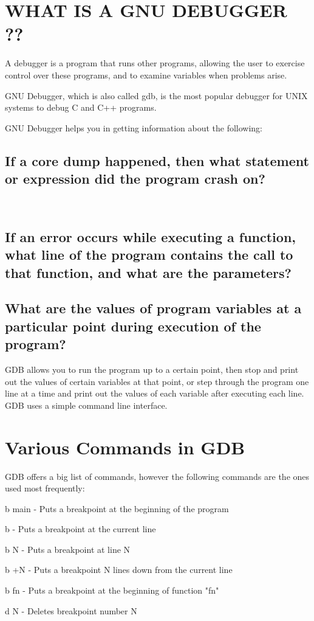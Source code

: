 \documentclass[12pt]{article}
\begin{document}
\section{WHAT IS A GNU DEBUGGER ??} A debugger is a program that runs other programs, allowing the user to exercise control over these programs, and to examine variables when problems arise.

GNU Debugger, which is also called gdb, is the most popular debugger for UNIX systems to debug C and C++ programs.

GNU Debugger helps you in getting information about the following: 
\subsection{If a core dump happened, then what statement or expression did the program crash on?}\\
\subsection{If an error occurs while executing a function, what line of the program contains the call to that function, and what are the parameters?}
\subsection{What are the values of program variables at a particular point during execution of the program?}
GDB allows you to run the program up to a certain point, then stop and print out the values of certain variables at that point, or step through the program one line at a time and print out the values of each variable after executing each line. GDB uses a simple command line interface.
\section{Various Commands in GDB}
GDB offers a big list of commands, however the following commands are the ones used most frequently:

    b main - Puts a breakpoint at the beginning of the program

    b - Puts a breakpoint at the current line

    b N - Puts a breakpoint at line N

    b +N - Puts a breakpoint N lines down from the current line

    b fn - Puts a breakpoint at the beginning of function "fn"

    d N - Deletes breakpoint number N
\end{document}
